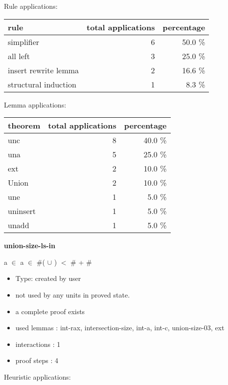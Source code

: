 \documentclass[a4paper]{article}
\begin{document}
Rule applications:

\begin{supertabular}{l|r|r}
rule	        & total applications & percentage \\ \hline
simplifier & 6 & 50.0 \% \\
all left & 3 & 25.0 \% \\
insert rewrite lemma & 2 & 16.6 \% \\
structural induction & 1 & 8.3 \% \\

\end{supertabular}

Lemma applications:

\begin{supertabular}{l|r|r}
theorem	        & total applications & percentage \\ \hline
unc & 8 & 40.0 \% \\
una & 5 & 25.0 \% \\
ext & 2 & 10.0 \% \\
Union & 2 & 10.0 \% \\
une & 1 & 5.0 \% \\
uninsert & 1 & 5.0 \% \\
unadd & 1 & 5.0 \% \\

\end{supertabular}
\pagebreak

{\LARGE\bf union-size-ls-in}\label{lemma-union-size-ls-in}

\medskip

 \Fol a $\in$  \And a $\in$  \Imp \#( $\cup$ ) $<$ \#  + \# 

\begin{itemize}

\item Type: created by user

\item not used by any units in proved state.
\item       a complete proof exists
\item       used lemmas  : int-rax, intersection-size, int-a, int-c, union-size-03, ext
\item       interactions : 1
\item       proof steps  : 4
\end{itemize}

\medskip


Heuristic applications:
\end{document}
